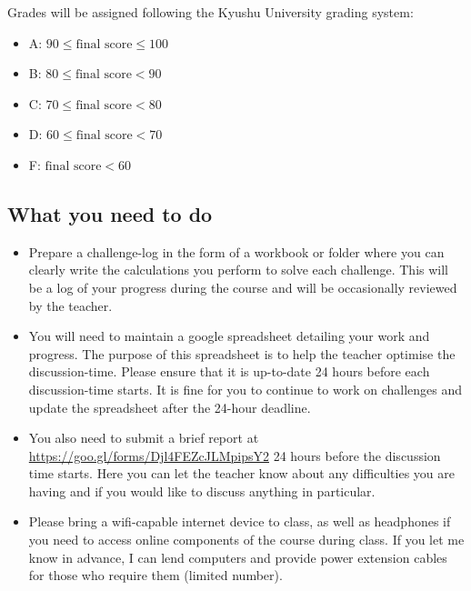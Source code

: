Grades will be assigned following the Kyushu University grading system:
\begin{itemize}
    \item A: $90 \le \text{final score} \le 100$
    \item B: $80 \le \text{final score} < 90$
    \item C: $70 \le \text{final score} < 80$
    \item D: $60 \le \text{final score} < 70$
    \item F: $\text{final score} < 60$
\end{itemize}



\subsection{What you need to do}
\begin{itemize}
    \item Prepare a challenge-log in the form of a workbook or folder where you can clearly write the calculations you perform to solve each challenge. This will be a log of your progress during the course and will be occasionally reviewed by the teacher.
    \item You will need to maintain a google spreadsheet detailing your work and progress. The purpose of this spreadsheet is to help the teacher optimise the discussion-time. Please ensure that it is up-to-date 24 hours before each discussion-time starts. It is fine for you to continue to work on challenges and update the spreadsheet after the 24-hour deadline.
    \item You also need to submit a brief report at \url{https://goo.gl/forms/Djl4FEZcJLMpipsY2} 24 hours before the discussion time starts. Here you can let the teacher know about any difficulties you are having and if you would like to discuss anything in particular.
    \item Please bring a wifi-capable internet device to class, as well as headphones if you need to access online components of the course during class. If you let me know in advance, I can lend computers and provide power extension cables for those who require them (limited number).
\end{itemize}


